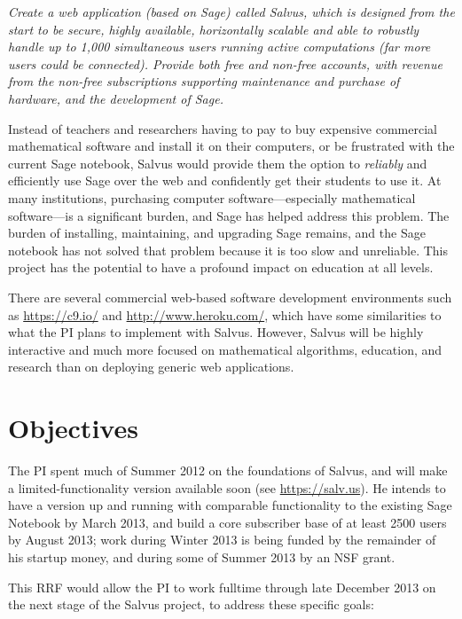 \documentclass[11pt]{article}
\begin{document}
 {\em Create a web application (based on Sage)
  called Salvus, which is designed from the start to be secure, highly
  available, horizontally scalable and able to robustly handle up to
  1,000 simultaneous users running active computations (far more users
  could be connected).  Provide both free and non-free accounts, with
  revenue from the non-free subscriptions supporting maintenance and
  purchase of hardware, and the development of Sage.}

Instead of teachers and researchers having to pay to buy expensive
commercial mathematical software and install it on their computers, or
be frustrated with the current Sage notebook, Salvus would provide
them the option to {\em reliably} and efficiently use Sage over the
web and confidently get their students to use it.  At many
institutions, purchasing computer software---especially mathematical
software---is a significant burden, and Sage has helped address this
problem. The burden of installing, maintaining, and upgrading Sage
remains, and the Sage notebook has not solved that problem because it
is too slow and unreliable.  This project has the potential to have a
profound impact on education at all levels.

There are several commercial web-based software development
environments such as \url{https://c9.io/} and
\url{http://www.heroku.com/}, which have some similarities to what the
PI plans to implement with Salvus.  However, Salvus will be highly
interactive and much more focused on mathematical algorithms,
education, and research than on deploying generic web applications.

\section{Objectives}

The PI spent much of Summer 2012 on the foundations of Salvus, and
will make a limited-functionality version available soon (see
\url{https://salv.us}).  He intends to have a version up and running
with comparable functionality to the existing Sage Notebook by March
2013, and build a core subscriber base of at least 2500 users by
August 2013; work during Winter 2013 is being funded by the remainder
of his startup money, and during some of Summer 2013 by an NSF grant.

This RRF would allow the PI to work
fulltime through late December 2013 on the next stage
of the Salvus project, to address these specific goals:
\end{document}
